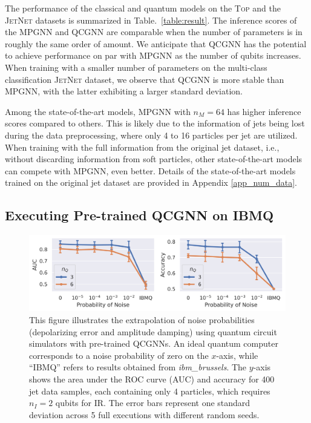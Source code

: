 \documentclass[reprint,amsmath,amssymb,prd,nofootinbib]{revtex4-2}
\newcommand{\Top}{\textsc{Top}\xspace}
\newcommand{\JetNet}{\textsc{JetNet}\xspace}
\begin{document}
 The performance of the classical and quantum models on the \Top and the \JetNet datasets is summarized in Table.~\ref{table:result}. The inference scores of the MPGNN and QCGNN are comparable when the number of parameters is in roughly the same order of amount. We anticipate that QCGNN has the potential to achieve performance on par with MPGNN as the number of qubits increases. When training with a smaller number of parameters on the multi-class classification \JetNet dataset, we observe that QCGNN is more stable than MPGNN, with the latter exhibiting a larger standard deviation.
 
 Among the state-of-the-art models, MPGNN with $n_M = 64$ has higher inference scores compared to others. This is likely due to the information of jets being lost during the data preprocessing, where only 4 to 16 particles per jet are utilized. When training with the full information from the original jet dataset, i.e., without discarding information from soft particles, other state-of-the-art models can compete with MPGNN, even better. Details of the state-of-the-art models trained on the original jet dataset are provided in Appendix \ref{app_num_data}.

\subsection{Executing Pre-trained QCGNN on IBMQ} \label{sec_ibmq}

\begin{figure}[htbp]
    \centering
    \includegraphics[width=\textwidth]{fig_noise_extrapolation.png}
    \caption{This figure illustrates the extrapolation of noise probabilities (depolarizing error and amplitude damping) using quantum circuit simulators with pre-trained QCGNNs. An ideal quantum computer corresponds to a noise probability of zero on the $x$-axis, while ``IBMQ'' refers to results obtained from \textit{ibm\_brussels}. The $y$-axis shows the area under the ROC curve (AUC) and accuracy for 400 jet data samples, each containing only 4 particles, which requires $n_I = 2$ qubits for IR. The error bars represent one standard deviation across 5 full executions with different random seeds.}
    \label{fig:noise_extrapolation}
\end{figure}
\end{document}
